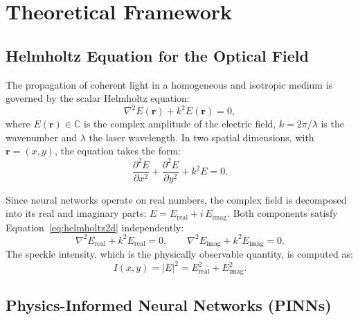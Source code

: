 
\section{Theoretical Framework}
\label{sec:theory}

\subsection{Helmholtz Equation for the Optical Field}
\label{subsec:helmholtz}

The propagation of coherent light in a homogeneous and isotropic medium is governed
by the scalar Helmholtz equation:
%
\begin{equation}
  \nabla^2 E(\mathbf{r}) + k^2 E(\mathbf{r}) = 0,
  \label{eq:helmholtz}
\end{equation}
%
where $E(\mathbf{r}) \in \mathbb{C}$ is the complex amplitude of the electric field,
$k = 2\pi/\lambda$ is the wavenumber and $\lambda$ the laser wavelength.
In two spatial dimensions, with $\mathbf{r} = (x, y)$, the equation takes the form:
%
\begin{equation}
  \frac{\partial^2 E}{\partial x^2} + \frac{\partial^2 E}{\partial y^2} + k^2 E = 0.
  \label{eq:helmholtz2d}
\end{equation}

Since neural networks operate on real numbers, the complex field is decomposed into
its real and imaginary parts: $E = E_{\mathrm{real}} + i\,E_{\mathrm{imag}}$.
Both components satisfy Equation~\eqref{eq:helmholtz2d} independently:
%
\begin{equation}
  \nabla^2 E_{\mathrm{real}} + k^2 E_{\mathrm{real}} = 0, \qquad
  \nabla^2 E_{\mathrm{imag}} + k^2 E_{\mathrm{imag}} = 0.
  \label{eq:helmholtz_split}
\end{equation}
%
The speckle intensity, which is the physically observable quantity, is computed as:
%
\begin{equation}
  I(x,y) = |E|^2 = E_{\mathrm{real}}^2 + E_{\mathrm{imag}}^2.
  \label{eq:intensity}
\end{equation}

\subsection{Physics-Informed Neural Networks (PINNs)}
\label{subsec:pinns}

